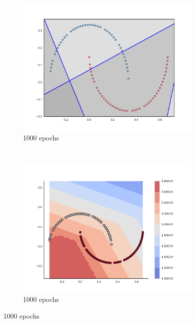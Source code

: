 \begin{figure}
  \centering
    \begin{subfigure}[b]{0.3\textwidth}
        \includegraphics[width=\textwidth]{img/zero/1000/09-conv2d_1-0.pdf}
        \caption{1000 epochs}
        \label{fig:zerosInput1000}
    \end{subfigure}
    ~ %
    \begin{subfigure}[b]{0.3\textwidth}
        \includegraphics[width=\textwidth]{img/zero/1000/57-09-output.pdf}
        \caption{1000 epochs}
        \label{fig:zerosOutput1000}
    \end{subfigure}

\end{figure}
